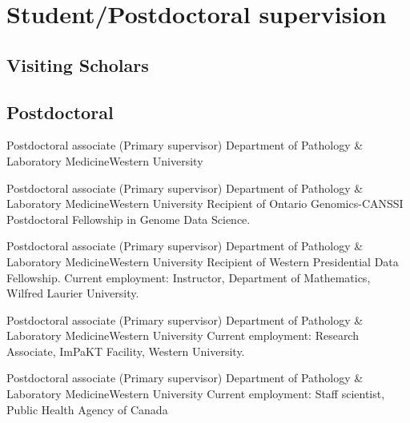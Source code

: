 
\section {Student/Postdoctoral supervision}

\subsection {Visiting Scholars}




\subsection {Postdoctoral}

{Postdoctoral associate (Primary supervisor)}
{Department of Pathology \& Laboratory Medicine}{Western University}
{}


{Postdoctoral associate (Primary supervisor)}
{Department of Pathology \& Laboratory Medicine}{Western University}
{Recipient of Ontario Genomics-CANSSI Postdoctoral Fellowship in Genome Data Science.}


{Postdoctoral associate (Primary supervisor)}
{Department of Pathology \& Laboratory Medicine}{Western University}
{Recipient of Western Presidential Data Fellowship.  Current employment: Instructor, Department of Mathematics, Wilfred Laurier University.}


{Postdoctoral associate (Primary supervisor)}
{Department of Pathology \& Laboratory Medicine}{Western University}
{Current employment: Research Associate, ImPaKT Facility, Western University.}


{Postdoctoral associate (Primary supervisor)}
{Department of Pathology \& Laboratory Medicine}{Western University}
{Current employment: Staff scientist, Public Health Agency of Canada}


